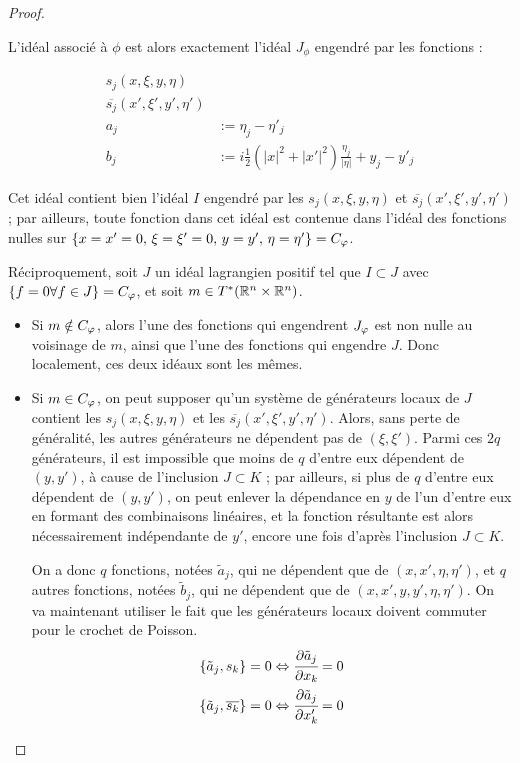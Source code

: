 \begin{proof}
\begin{enumerate}
  L'idéal associé à $\phi$ est alors exactement l'idéal $J_{\phi}$ engendré par les fonctions :
  
  \begin{align*}
    s_j(x,\xi,y,\eta)&\\
    \overline{s_j}(x',\xi',y',\eta')&\\
    a_j &:= \eta_j - \eta'_j\\
    b_j &:= i \frac 12 (|x|^2 + |x'|^2)\frac{\eta_j}{|\eta|} + y_j-y'_j
  \end{align*}
  
  Cet idéal contient bien l'idéal $I$ engendré par les $s_j(x,\xi,y,\eta)$ et $\overline{s_j}(x',\xi',y',\eta')$ ; par ailleurs, toute fonction dans cet idéal est con\-tenue dans l'idéal des fonctions nulles sur  $\{x=x'=0,\,\xi=\xi'=0,\,y=y',\,\eta=\eta'\}=C_{\varphi}$.
  
Réciproquement, soit $J$ un idéal lagrangien positif tel que $I \subset J$ avec $\{f=0 \forall f \in J\}=C_{\varphi}$, et soit $m \in T^*(\mathbb{R}^n \times \mathbb{R}^n)$.

\begin{itemize}
  \item Si $m \notin C_{\varphi}$, alors l'une des fonctions qui engendrent $J_{\varphi}$ est non nulle au voisinage de $m$, ainsi que l'une des fonctions qui engendre $J$. Donc localement, ces deux idéaux sont les mêmes.
  
  \item Si $m\in C_{\varphi}$, on peut supposer qu'un système de générateurs locaux de $J$ contient les $s_j(x,\xi,y,\eta)$ et les $\overline{s_j}(x',\xi',y',\eta')$. Alors, sans perte de généralité, les autres générateurs ne dépendent pas de $(\xi,\xi')$. Parmi ces $2q$ générateurs, il est impossible que moins de $q$ d'entre eux dépendent de $(y,y')$, à cause de l'inclusion $J \subset K$ ; par ailleurs, si plus de $q$ d'entre eux dépendent de $(y,y')$, on peut enlever la dépendance en $y$ de l'un d'entre eux en formant des combinaisons linéaires, et la fonction résultante est alors nécessairement indépendante de $y'$, encore une fois d'après l'inclusion $J \subset K$.

On a donc $q$ fonctions, notées $\tilde{a}_j$, qui ne dépendent que de $(x,x',\eta,\eta')$, et $q$ autres fonctions, notées $\tilde{b}_j$, qui ne dépendent que de $(x,x',y,y',\eta,\eta')$. On va maintenant utiliser le fait que les générateurs locaux doivent commuter pour le crochet de Poisson.
\begin{align*}
  \{\tilde{a}_j,s_k\}=0 \Leftrightarrow \cfrac{\partial \tilde{a}_j}{\partial x_k} =0\\
   \{\tilde{a}_j,\overline{s_k}\}=0 \Leftrightarrow \cfrac{\partial \tilde{a}_j}{\partial x'_k} =0
\end{align*}


\end{itemize}
\end{enumerate}
\end{proof}
